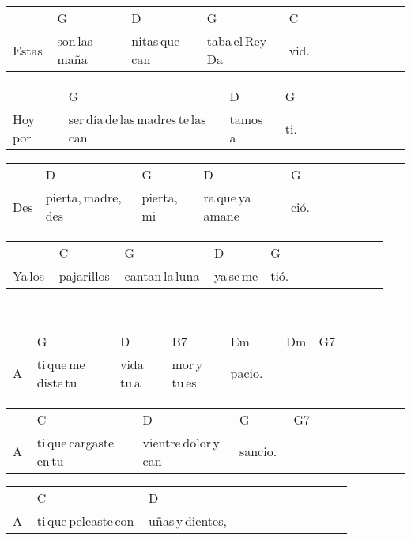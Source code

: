\hfill
\begin{multicols}{2}
\noindent
\begin{minipage}{\columnwidth}
\noindent
\noindent
\begin{tabular}{llllllllllll}
&G&D&G&C\\
Estas\,&son\,las\,maña&nitas\,que\,can&taba\,el\,Rey\,Da&vid.
\end{tabular}

\noindent
\begin{tabular}{llllllllllll}
&G&D&G\\
Hoy\,por\,&ser\,día\,de\,las\,madres\,te\,las\,can&tamos\,a\,&ti.
\end{tabular}

\noindent
\begin{tabular}{llllllllllll}
&D&G&D&G\\
Des&pierta,\,madre,\,des&pierta,\,mi&ra\,que\,ya\,amane&ció.
\end{tabular}

\noindent
\begin{tabular}{llllllllllll}
&C&G&D&G\\
Ya\,los\,&pajarillos\,&cantan\,la\,luna\,&ya\,se\,me&tió.
\end{tabular}
\end{minipage}\\

\noindent
\begin{minipage}{\columnwidth}
\noindent
\noindent
\begin{tabular}{llllllllllll}
&G&D&B7&Em&Dm&G7\\
A\,&ti\,que\,me\,diste\,tu\,&vida\,tu\,a&mor\,y\,tu\,es&pacio.\,\,\,\,\,&\,\,\quad\,\,\,&
\end{tabular}

\noindent
\begin{tabular}{llllllllllll}
&C&D&G&G7\\
A\,&ti\,que\,cargaste\,en\,tu\,&vientre\,dolor\,y\,can&sancio.\,\,&
\end{tabular}

\noindent
\begin{tabular}{llllllllllll}
&C&D\\
A\,&ti\,que\,peleaste\,con\,&uñas\,y\,dientes,
\end{tabular}


\end{minipage}
\end{multicols}
